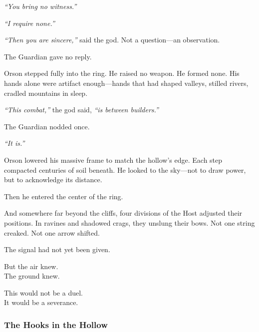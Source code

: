 \documentclass[12pt]{article}
\begin{document}
\vspace{0.5em}
\textit{``You bring no witness.''}

\vspace{0.5em}
\textit{``I require none.''}

\vspace{0.5em}
\textit{``Then you are sincere,''} said the god. Not a question---an observation.

\vspace{0.5em}
The Guardian gave no reply.

\vspace{0.5em}
Orson stepped fully into the ring. He raised no weapon. He formed none. His hands alone were artifact enough---hands that had shaped valleys, stilled rivers, cradled mountains in sleep.

\vspace{0.5em}
\textit{``This combat,''} the god said, \textit{``is between builders.''}

\vspace{0.5em}
The Guardian nodded once.

\vspace{0.5em}
\textit{``It is.''}

\vspace{0.5em}
Orson lowered his massive frame to match the hollow’s edge. Each step compacted centuries of soil beneath. He looked to the sky---not to draw power, but to acknowledge its distance.

\vspace{0.5em}
Then he entered the center of the ring.

\vspace{0.5em}
And somewhere far beyond the cliffs, four divisions of the Host adjusted their positions. In ravines and shadowed crags, they unslung their bows. Not one string creaked. Not one arrow shifted.

\vspace{0.5em}
The signal had not yet been given.

\vspace{0.5em}
But the air knew.\\
The ground knew.

\vspace{0.5em}
This would not be a duel.\\
It would be a severance.


\dotfill

\subsubsection*{The Hooks in the Hollow}
\end{document}
